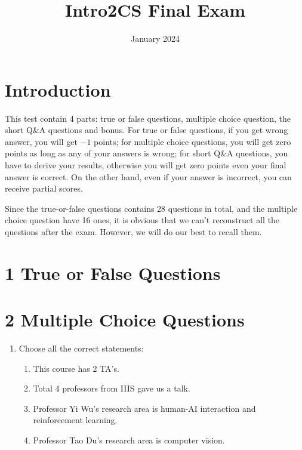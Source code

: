 \documentclass{article}
\title{Intro2CS Final Exam}
\author{}
\date{January 2024}
\begin{document}
\maketitle

\section*{Introduction}

This test contain 4 parts: true or false questions, multiple choice question, the short Q\&A questions and bonus. For true or false questions, if you get wrong answer, you will get $-1$ points; for multiple choice questions, you will get zero points as long as any of your answers is wrong; for short Q\&A questions, you have to derive your results, otherwise you will get zero points even your final answer is correct. On the other hand, even if your answer is incorrect, you can receive partial scores.

Since the true-or-false questions contains 28 questions in total, and the multiple choice question have 16 ones, it is obvious that we can't reconstruct all the questions after the exam. However, we will do our best to recall them.
\section*{1 True or False Questions}

\section*{2 Multiple Choice Questions}
\begin{enumerate}
    \item Choose all the correct statements:
    \begin{enumerate}
        \item This course has 2 TA's.
        \item Total 4 professors from IIIS gave us a talk.
        \item Professor Yi Wu's research area is human-AI interaction and reinforcement learning.
        \item Professor Tao Du's research area is computer vision.
    \end{enumerate}
\end{enumerate}
\end{document}
